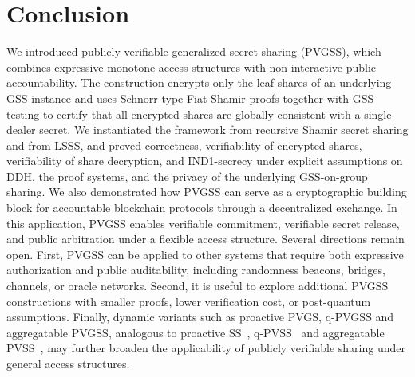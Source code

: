 \documentclass[runningheads]{llncs}
\begin{document}
\section{Conclusion}
\label{sec:conclusion}
We introduced publicly verifiable generalized secret sharing (PVGSS), which combines expressive monotone access structures with non-interactive public accountability. The construction encrypts only the leaf shares of an underlying GSS instance and uses Schnorr-type Fiat-Shamir proofs together with GSS testing to certify that all encrypted shares are globally consistent with a single dealer secret. We instantiated the framework from recursive Shamir secret sharing and from LSSS, and proved correctness, verifiability of encrypted shares, verifiability of share decryption, and IND1-secrecy under explicit assumptions on DDH, the proof systems, and the privacy of the underlying GSS-on-group sharing.
We also demonstrated how PVGSS can serve as a cryptographic building block for accountable blockchain protocols through a decentralized exchange. In this application, PVGSS enables verifiable commitment, verifiable secret release, and public arbitration under a flexible access structure. 
Several directions remain open. 
First, PVGSS can be applied to other systems that require both expressive authorization and public auditability, including randomness beacons, bridges, channels, or oracle networks.
Second, it is useful to explore additional PVGSS constructions with smaller proofs, lower verification cost, or post-quantum assumptions. 
Finally, dynamic variants such as proactive PVGS, q-PVGSS and aggregatable PVGSS, analogous to proactive SS~\cite{Bagherpour2022VPSS}, q-PVSS~\cite{cascudo2024publicly} and aggregatable PVSS~\cite{Bacho2023Beacon}, may further broaden the applicability of publicly verifiable sharing under general access structures.



\appendix
\renewcommand{\theHsection}{appendix.\thesection}
\renewcommand{\theHsubsection}{appendix.\thesection.\arabic{subsection}}
\end{document}
